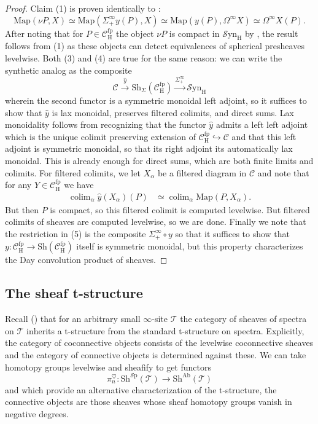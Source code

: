 \documentclass[10pt]{amsart}
\theoremstyle{definition}
\numberwithin{figure}{section}
\numberwithin{equation}{section}
\newcommand{\cC}{\mathcal{C}}
\newcommand{\cT}{\mathcal{T}}
\theoremstyle{cited}
\newcommand{\colim}{\operatorname{colim}}
\newcommand{\Ab}{\mathrm{Ab}}
\newcommand{\Sp}{{\mathcal{S}\mathrm{p}}}
\newcommand{\Map}{\mathrm{Map}}
\newcommand{\Sh}{\mathrm{Sh}}
\newcommand{\fp}{\mathrm{fp}}
\newcommand{\Syn}{\mathcal{S}\mathrm{yn}}
\renewcommand{\H}{\mathrm{H}}
\begin{document}
\begin{proof}
  Claim (1) is proven identically to \cite[Lemma 4.11]{Pst22}:
  \[
  \Map(\nu P, X)\simeq \Map(\Sigma_+^\infty y(P), X)\simeq \Map(y(P), \Omega^\infty X)\simeq \Omega^\infty X(P).
  \]
  After noting that for $P\in \cC_\H^\fp$ the object $\nu P$ is compact in $\Syn_\H$ by \cite[Cor. 4.12]{Pst22}, the result follows from (1) as these objects can detect equivalences of spherical presheaves levelwise. Both (3) and (4) are true for the same reason: we can write the synthetic analog as the composite
  \[
  \cC\xrightarrow{\hat y} \Sh_\Sigma(\cC_\H^\fp) \xrightarrow{\Sigma_+^\infty}\Syn_\H
  \]
  wherein the second functor is a symmetric monoidal left adjoint, so it suffices to show that $\hat y$ is lax monoidal, preserves filtered colimits, and direct sums. Lax monoidality follows from recognizing that the functor $\hat y$ admits a left left adjoint which is the unique colimit preserving extension of $\cC^\fp_\H\hookrightarrow \cC$ and that this left adjoint is symmetric monoidal, so that its right adjoint its automatically lax monoidal. This is already enough for direct sums, which are both finite limits and colimits. For filtered colimits, we let $X_\alpha$ be a filtered diagram in $\cC$ and note that for any $Y\in \cC_\H^\fp$ we have
  \begin{align*}
    \colim_\alpha \hat y(X_\alpha)(P) & \simeq \colim_\alpha \Map(P, X_\alpha).
  \end{align*}
  But then $P$ is compact, so this filtered colimit is computed levelwise. But filtered colimits of sheaves are computed levelwise, so we are done. Finally we note that the restriction in (5) is the composite $\Sigma^\infty_+ \circ y$ so that it suffices to show that $y:\cC_\H^\fp\to \Sh(\cC_\H^\fp)$ itself is symmetric monoidal, but this property characterizes the Day convolution product of sheaves.
\end{proof}

\subsection{The sheaf t-structure} 

Recall (\cite{todo}) that for an arbitrary small $\infty$-site $\cT$ the category of sheaves of spectra on $\cT$ inherits a t-structure from the standard t-structure on spectra. Explicitly, the category of coconnective objects consists of the levelwise coconnective sheaves and the category of connective objects is determined against these. We can take homotopy groups levelwise and sheafify to get functors
\[
  \pi^\heartsuit_n:\Sh^\Sp(\cT)\to \Sh^\Ab(\cT)
\]
and which provide an alternative characterization of the t-structure, the connective objects are those sheaves whose sheaf homotopy groups vanish in negative degrees. 
\end{document}
